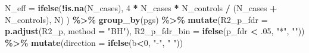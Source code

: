 \documentclass[
]{article}
\newenvironment{Shaded}{\begin{snugshade}}{\end{snugshade}}
\newcommand{\AttributeTok}[1]{\textcolor[rgb]{0.13,0.29,0.53}{#1}}
\newcommand{\DecValTok}[1]{\textcolor[rgb]{0.00,0.00,0.81}{#1}}
\newcommand{\FunctionTok}[1]{\textcolor[rgb]{0.13,0.29,0.53}{\textbf{#1}}}
\newcommand{\NormalTok}[1]{#1}
\newcommand{\SpecialCharTok}[1]{\textcolor[rgb]{0.81,0.36,0.00}{\textbf{#1}}}
\newcommand{\StringTok}[1]{\textcolor[rgb]{0.31,0.60,0.02}{#1}}
\begin{document}
\begin{Shaded}
\begin{Highlighting}[]
    \AttributeTok{N\_eff =} \FunctionTok{ifelse}\NormalTok{(}\SpecialCharTok{!}\FunctionTok{is.na}\NormalTok{(N\_cases),}
                   \DecValTok{4} \SpecialCharTok{*}\NormalTok{ N\_cases }\SpecialCharTok{*}\NormalTok{ N\_controls }\SpecialCharTok{/}\NormalTok{ (N\_cases }\SpecialCharTok{+}\NormalTok{ N\_controls),}
\NormalTok{                   N)}
\NormalTok{  ) }\SpecialCharTok{\%\textgreater{}\%} 
  \FunctionTok{group\_by}\NormalTok{(pgs) }\SpecialCharTok{\%\textgreater{}\%} 
  \FunctionTok{mutate}\NormalTok{(}\AttributeTok{R2\_p\_fdr =} \FunctionTok{p.adjust}\NormalTok{(R2\_p, }\AttributeTok{method =} \StringTok{"BH"}\NormalTok{),         }
         \AttributeTok{R2\_p\_fdr\_bin =} \FunctionTok{ifelse}\NormalTok{(p\_fdr }\SpecialCharTok{\textless{}}\NormalTok{ .}\DecValTok{05}\NormalTok{, }\StringTok{"*"}\NormalTok{, }\StringTok{""}\NormalTok{)) }\SpecialCharTok{\%\textgreater{}\%} 
  \FunctionTok{mutate}\NormalTok{(}\AttributeTok{direction =} \FunctionTok{ifelse}\NormalTok{(b}\SpecialCharTok{\textless{}}\DecValTok{0}\NormalTok{, }\StringTok{"{-}"}\NormalTok{, }\StringTok{" "}\NormalTok{))}


\end{Highlighting}
\end{Shaded}
\end{document}
